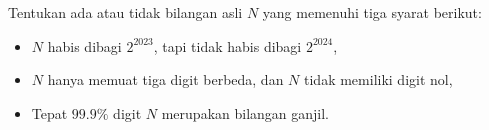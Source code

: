 Tentukan ada atau tidak bilangan asli $N$ yang memenuhi tiga syarat berikut:
    \begin{itemize}
        \item $N$ habis dibagi $2^{2023}$, tapi tidak habis dibagi $2^{2024}$,
        \item $N$ hanya memuat tiga digit berbeda, dan $N$ tidak memiliki digit nol,
        \item Tepat $99.9\%$ digit $N$ merupakan bilangan ganjil.
    \end{itemize}